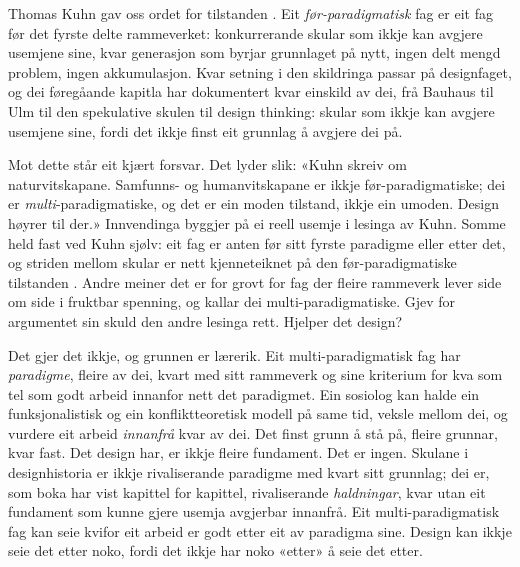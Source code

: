 Thomas Kuhn gav oss ordet for tilstanden \autocite{kuhn1962}. Eit \emph{før-paradigmatisk} fag er eit fag før det fyrste delte rammeverket: konkurrerande skular som ikkje kan avgjere usemjene sine, kvar generasjon som byrjar grunnlaget på nytt, ingen delt mengd problem, ingen akkumulasjon. Kvar setning i den skildringa passar på designfaget, og dei føregåande kapitla har dokumentert kvar einskild av dei, frå Bauhaus til Ulm til den spekulative skulen til design thinking: skular som ikkje kan avgjere usemjene sine, fordi det ikkje finst eit grunnlag å avgjere dei på.

Mot dette står eit kjært forsvar. Det lyder slik: «Kuhn skreiv om naturvitskapane. Samfunns- og humanvitskapane er ikkje før-paradigmatiske; dei er \emph{multi}-paradigmatiske, og det er ein moden tilstand, ikkje ein umoden. Design høyrer til der.» Innvendinga byggjer på ei reell usemje i lesinga av Kuhn. Somme held fast ved Kuhn sjølv: eit fag er anten før sitt fyrste paradigme eller etter det, og striden mellom skular er nett kjenneteiknet på den før-paradigmatiske tilstanden \autocite{kuhn1962}. Andre meiner det er for grovt for fag der fleire rammeverk lever side om side i fruktbar spenning, og kallar dei multi-paradigmatiske. Gjev for argumentet sin skuld den andre lesinga rett. Hjelper det design?

Det gjer det ikkje, og grunnen er lærerik. Eit multi-paradigmatisk fag har \emph{paradigme}, fleire av dei, kvart med sitt rammeverk og sine kriterium for kva som tel som godt arbeid innanfor nett det paradigmet. Ein sosiolog kan halde ein funksjonalistisk og ein konfliktteoretisk modell på same tid, veksle mellom dei, og vurdere eit arbeid \emph{innanfrå} kvar av dei. Det finst grunn å stå på, fleire grunnar, kvar fast. Det design har, er ikkje fleire fundament. Det er ingen. Skulane i designhistoria er ikkje rivaliserande paradigme med kvart sitt grunnlag; dei er, som boka har vist kapittel for kapittel, rivaliserande \emph{haldningar}, kvar utan eit fundament som kunne gjere usemja avgjerbar innanfrå. Eit multi-paradigmatisk fag kan seie kvifor eit arbeid er godt etter eit av paradigma sine. Design kan ikkje seie det etter noko, fordi det ikkje har noko «etter» å seie det etter.


